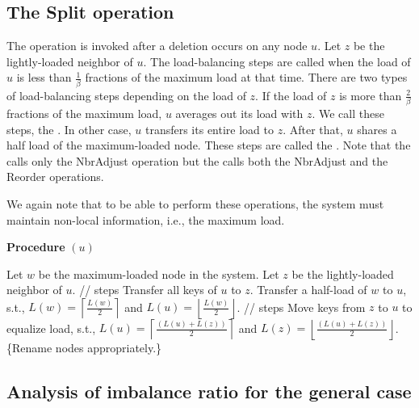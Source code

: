 \documentclass[a4paper]{article}
\begin{document}
\subsection{The Split operation}

The {\split} operation is invoked after a deletion occurs on any node
$u$. Let $z$ be the lightly-loaded neighbor of $u$. 
The load-balancing steps are called when the load of $u$ is less
than $\frac{1}{\beta}$ fractions of the maximum load at that time. There are
two types of load-balancing steps depending on the load of $z$.  If
the load of $z$ is more than $\frac{2}{\beta}$ fractions of the maximum load,
$u$ averages out its load with $z$. We call these steps, the
{\splitnbr}. In other case, $u$ transfers its entire load to $z$.
After that, $u$ shares a half load of the maximum-loaded node.  These
steps are called the {\splitmax}. Note that the {\splitnbr} calls
only the {\sc NbrAdjust} operation but the {\splitmax} calls both the
{\sc NbrAdjust} and the {\sc Reorder} operations.

We again note that to be able to perform these operations, the system
must maintain non-local information, i.e., the maximum load.

\begin{algorithm} {\bf Procedure} {\split} $(u)$
  \label{alg:split}
  \begin{algorithmic}[1]
    \STATE Let $w$ be the maximum-loaded node in the system. 
    \STATE Let $z$ be the lightly-loaded neighbor of $u$. 
    \STATE //{\splitmax} steps 
    \STATE Transfer all keys of $u$ to $z$.
    \STATE Transfer a half-load of $w$ to $u$, s.t., $L(w) =
    \left\lceil \frac{L(w)}{2}\right\rceil$ and $L(u) = \left\lfloor
      \frac{L(w)}{2}\right\rfloor$. 
    \ELSE 
    \STATE //{\splitnbr} steps 
    \STATE
    Move keys from $z$ to $u$ to equalize load, s.t., $L(u) = \left
      \lceil \frac{(L(u)+L(z))}{2}\right\rceil$ and $L(z) = \left\lfloor
      \frac{(L(u)+L(z))}{2} \right\rfloor$.
    \ENDIF
    \STATE \{Rename nodes appropriately.\}
    \ENDIF
  \end{algorithmic}
\end{algorithm}

\subsection{Analysis of imbalance ratio for the general case}
\end{document}
